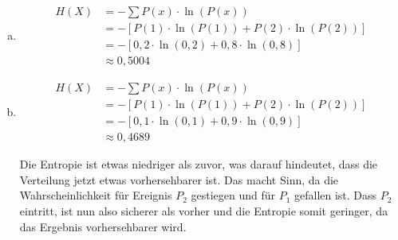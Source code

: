 \documentclass[a4paper,12pt]{article}
\begin{document}
\begin{enumerate}
{\begin{enumerate}[a)]
		\item
		
		\begin{align*}
			H(X) &= - \sum P(x) \cdot \ln(P(x)) \\
				 &= - [P(1) \cdot \ln(P(1)) + P(2) \cdot \ln(P(2))] \\
     			 &= - [0,2 \cdot \ln(0,2) + 0,8 \cdot \ln(0,8)] \\
     			 &\approx 0,5004
		\end{align*}
		
		\item
		
		\begin{align*}
			H(X) &= - \sum P(x) \cdot \ln(P(x)) \\
				 &= - [P(1) \cdot \ln(P(1)) + P(2) \cdot \ln(P(2))] \\
     			 &= - [0,1 \cdot \ln(0,1) + 0,9 \cdot \ln(0,9)] \\
     			 &\approx 0,4689
		\end{align*}
		
		Die Entropie ist etwas niedriger als zuvor, was darauf hindeutet, dass die Verteilung jetzt etwas vorhersehbarer ist. 
		Das macht Sinn, da die Wahrscheinlichkeit für Ereignis $P_2$ gestiegen und für $P_1$ gefallen ist. Dass $P_2$ eintritt, ist
		nun also sicherer als vorher und die Entropie somit geringer, da das Ergebnis vorhersehbarer wird.

	\end{enumerate}

}

\end{enumerate}



\end{document}
